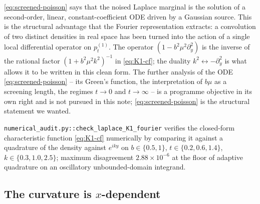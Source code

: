 \documentclass[11pt]{article}
\theoremstyle{definition}
\begin{document}
\begin{intuition}
\eqref{eq:screened-poisson} says that the noised Laplace marginal is
the solution of a second-order, linear, constant-coefficient ODE
driven by a Gaussian source. This is the structural advantage that
the Fourier representation extracts: a convolution of two distinct
densities in real space has been turned into the action of a single
local differential operator on \(p_t^{(1)}\). The operator
\((1 - b^2 \mu^2 \partial_y^2)\) is the inverse of the rational factor
\((1 + b^2 \mu^2 k^2)^{-1}\) in \eqref{eq:K1-cf}; the duality
\(k^2 \leftrightarrow -\partial_y^2\) is what allows it to be written
in this clean form. The further analysis of the ODE
\eqref{eq:screened-poisson} -- its Green's function, the
interpretation of \(b \mu\) as a screening length, the regimes
\(t \to 0\) and \(t \to \infty\) -- is a programme objective in its
own right and is not pursued in this note; \eqref{eq:screened-poisson}
is the structural statement we wanted.
\end{intuition}

\begin{auditbox}
\texttt{numerical\_audit.py::check\_laplace\_K1\_fourier} verifies the
closed-form characteristic function \eqref{eq:K1-cf} numerically by
comparing it against a quadrature of the density against \(e^{i k y}\)
on \(b \in \{0.5, 1\}\), \(t \in \{0.2, 0.6, 1.4\}\),
\(k \in \{0.3, 1.0, 2.5\}\); maximum disagreement \(2.88 \times
10^{-6}\) at the floor of adaptive quadrature on an oscillatory
unbounded-domain integrand.
\end{auditbox}

\subsection{The curvature is \(x\)-dependent}\label{sec:K1-curvature}
\end{document}
